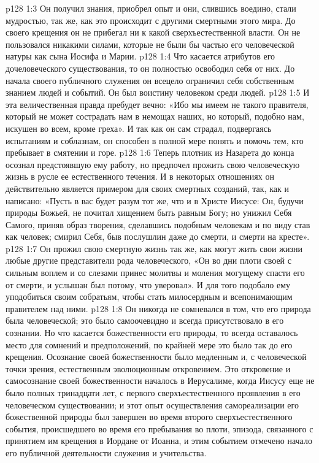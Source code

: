 \vs p128 1:3 Он получил знания, приобрел опыт и они, слившись воедино, стали мудростью, так же, как это происходит с другими смертными этого мира. До своего крещения он не прибегал ни к какой сверхъестественной власти. Он не пользовался никакими силами, которые не были бы частью его человеческой натуры как сына Иосифа и Марии.
\vs p128 1:4 Что касается атрибутов его дочеловеческого существования, то он полностью освободил себя от них. До начала своего публичного служения он всецело ограничил себя собственным знанием людей и событий. Он был воистину человеком среди людей.
\vs p128 1:5 \pc И эта величественная правда пребудет вечно: «Ибо мы имеем не такого правителя, который не может сострадать нам в немощах наших, но который, подобно нам, искушен во всем, кроме греха». И так как он сам страдал, подвергаясь испытаниям и соблазнам, он способен в полной мере понять и помочь тем, кто пребывает в смятении и горе.
\vs p128 1:6 \pc Теперь плотник из Назарета до конца осознал предстоявшую ему работу, но предпочел прожить свою человеческую жизнь в русле ее естественного течения. И в некоторых отношениях он действительно является примером для своих смертных созданий, так, как и написано: «Пусть в вас будет разум тот же, что и в Христе Иисусе: Он, будучи природы Божьей, не почитал хищением быть равным Богу; но унижил Себя Самого, приняв образ творения, сделавшись подобным человекам и по виду став как человек; смирил Себя, быв послушлин даже до смерти, и смерти на кресте».
\vs p128 1:7 Он прожил свою смертную жизнь так же, как могут жить свои жизни любые другие представители рода человеческого, «Он во дни плоти своей с сильным воплем и со слезами принес молитвы и моления могущему спасти его от смерти, и услышан был потому, что уверовал». И для того подобало ему  уподобиться своим собратьям, чтобы стать милосердным и всепонимающим правителем над ними.
\vs p128 1:8 Он никогда не сомневался в том, что его природа была человеческой; это было самоочевидно и всегда присутствовало в его сознании. Но что касается божественности его природы, то всегда оставалось место для сомнений и предположений, по крайней мере это было так до его крещения. Осознание своей божественности было медленным и, с человеческой точки зрения, естественным эволюционным откровением. Это откровение и самосознание своей божественности началось в Иерусалиме, когда Иисусу еще не было полных тринадцати лет, с первого сверхъестественного проявления в его человеческом существовании; и этот опыт осуществления самореализации его божественной природы был завершен во время второго сверхъестественного события, происшедшего во время его пребывания во плоти, эпизода, связанного с принятием им крещения в Иордане от Иоанна, и этим событием отмечено начало его публичной деятельности служения и учительства.
